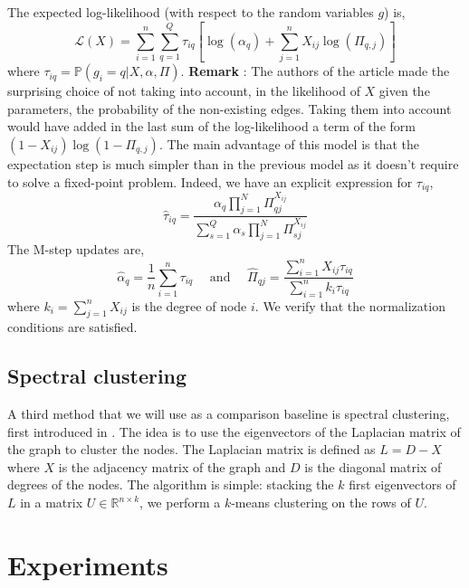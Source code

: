 \documentclass[switch, 12pt]{article}
\newcommand{\jump}{\newline\newline}
\begin{document}
\begin{multicols}{2}
    The expected log-likelihood (with respect to the random variables $g$) is,
    \begin{equation}
        \mathcal{L}(X) = \sum_{i=1}^n\sum_{q=1}^Q \tau_{iq} \left[ \log(\alpha_q) + \sum_{j=1}^n X_{ij} \log(\Pi_{q, j}) \right]
    \end{equation}
    where $\tau_{iq} = \mathbb{P}(g_i = q | X, \alpha, \Pi)$.
    \newline
    \textbf{Remark} : The authors of the article made the surprising choice of not taking into account, in the likelihood of $X$ given the parameters, the probability of the non-existing edges. Taking them into account would have added in the last sum of the log-likelihood a term of the form $(1 - X_{ij}) \log(1 - \Pi_{q, j})$.
    \jump
    The main advantage of this model is that the expectation step is much simpler than in the previous model as it doesn't require to solve a fixed-point problem. Indeed, we have an explicit expression for $\tau_{iq}$,
    \begin{equation}
        \hat{\tau}_{iq} = \frac{\alpha_q\prod_{j=1}^N \Pi_{qj}^{X_{ij}}}{\sum_{s=1}^Q \alpha_s\prod_{j=1}^N \Pi_{sj}^{X_{ij}}}
    \end{equation}
    The M-step updates are,
    \begin{equation}
        \hat{\alpha}_q = \frac{1}{n} \sum_{i=1}^n \tau_{iq} \quad\text{ and }\quad \hat{\Pi}_{qj} = \frac{\sum_{i=1}^n X_{ij}\tau_{iq} }{\sum_{i=1}^n k_i \tau_{iq}}
    \end{equation}
    where $k_i = \sum_{j=1}^n X_{ij}$ is the degree of node $i$. We verify that the normalization conditions are satisfied.

    \subsection{Spectral clustering}
    \label{subsec:spectral}
    A third method that we will use as a comparison baseline is spectral clustering, first introduced in \cite{spectral}. The idea is to use the eigenvectors of the Laplacian matrix of the graph to cluster the nodes. The Laplacian matrix is defined as $ L = D - X$ where $X$ is the adjacency matrix of the graph and $D$ is the diagonal matrix of degrees of the nodes.
    \jump
    The algorithm is simple: stacking the $k$ first eigenvectors of $L$ in a matrix $U \in \mathbb{R}^{n \times k}$, we perform a $k$-means clustering on the rows of $U$.

    \section{Experiments}
    \label{sec:experiments}


\end{multicols}
\end{document}
